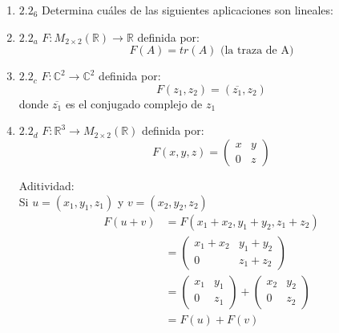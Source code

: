 \documentclass{article}
\begin{document}
		\begin{enumerate}
			
			
			\item[] \(2.2_6\) Determina cuáles de las siguientes aplicaciones son lineales:
			
			
			\item \(2.2_a\) 
			\(F:M_{2\times2}(\mathbb{R})\to \mathbb{R}\) definida por:
			\begin{equation*}
				F(A) = tr(A) \text{ (la traza de A)}
			\end{equation*}
			
			
			\item \(2.2_c\) 
			\(F:\mathbb{C}^2 \to \mathbb{C}^2\) definida por:
			\begin{equation*}
				F(z_1, z_2) = (\overline{z_1}, z_2)
			\end{equation*}
			donde \(\overline{z_1}\) es el conjugado complejo de \(z_1\)
			
			
			\item \(2.2_d\) 
			\(F:\mathbb{R}^3 \to M_{2\times2}(\mathbb{R})\) definida por:
			\begin{equation*}
				F(x,y,z) = 
				\begin{pmatrix}
					x & y \\
					0 & z
				\end{pmatrix}
			\end{equation*}
			
			Aditividad:\\
			Si \(u=(x_1,y_1,z_1)\) y \(v=(x_2,y_2,z_2)\)
			\begin{equation*}
				\begin{aligned}
					F(u+v) &=F(x_1+x_2,y_1+y_2,z_1+z_2)\\ 
						   &=\begin{pmatrix}
						   		x_1+x_2 & y_1+y_2 \\
						   		0       & z_1+z_2
						     \end{pmatrix}\\ 
						   &=\begin{pmatrix}
						   		x_1 & y_1 \\
						   		0   & z_1
						     \end{pmatrix} +
						     \begin{pmatrix}
						     	x_2 & y_2\\
						     	0   & z_2
						     \end{pmatrix}\\
						   &=F(u)+F(v)
				\end{aligned}
			\end{equation*}
			

\end{enumerate}
\end{document}
